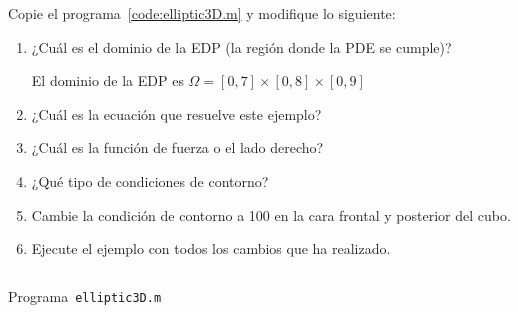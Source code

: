 \begin{problem}
Copie el programa~\ref{code:elliptic3D.m} y modifique lo siguiente:

\begin{enumerate}
      \item

            ¿Cuál es el dominio de la EDP (la región donde la PDE se cumple)?

            \begin{solution}
                  El dominio de la EDP es
                  \begin{math}
                        \Omega=
                        \left[
                              0,7
                              \right]\times
                        \left[
                              0,8
                              \right]\times
                        \left[
                              0,9
                              \right]
                  \end{math}
            \end{solution}

      \item

            ¿Cuál es la ecuación que resuelve este ejemplo?

            \begin{solution}
            \end{solution}

      \item

            ¿Cuál es la función de fuerza o el lado derecho?

            \begin{solution}
            \end{solution}

      \item

            ¿Qué tipo de condiciones de contorno?

            \begin{solution}
            \end{solution}

      \item

            Cambie la condición de contorno a 100 en la cara frontal y posterior del cubo.

            \begin{solution}
            \end{solution}

      \item

            Ejecute el ejemplo con todos los cambios que ha realizado.

            \begin{solution}
            \end{solution}
\end{enumerate}
\end{problem}

\begin{listing}[ht!]
      \tiny
      \centering
      \inputminted[frame=single,framesep=10pt,linenos,firstline=1,lastline=38,highlightlines={14,15}]{octave}{../examples/octave/elliptic3D.m}
      \caption{Programa~\texttt{elliptic3D.m}}
      \label{code:elliptic3D.m}
\end{listing}